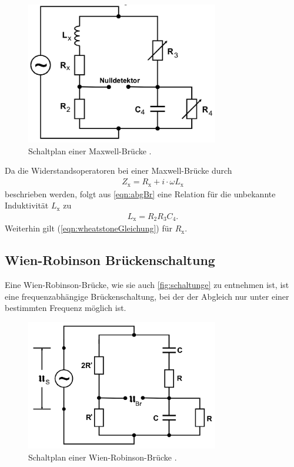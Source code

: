 \sloppy
\begin{figure}[H]
    \centering
    \includegraphics[width=0.75\textwidth]{dateien/aufgabed).png}
    \caption{Schaltplan einer Maxwell-Brücke \cite{anleitung}.}
    \label{fig:schaltungd}
\end{figure}
Da die Widerstandsoperatoren bei einer Maxwell-Brücke durch
\begin{align*}
    Z_{\text{x}} = R_{\text{x}} + i\cdot \omega L_{\text{x}}
\end{align*}
beschrieben werden, folgt aus \autoref{eqn:abgBr} eine Relation für die unbekannte Induktivität $L_{\text{x}}$ zu
\begin{align}
    L_{\text{x}} = R_2R_3C_4.
    \label{eqn:maxwellgl}
\end{align}
Weiterhin gilt (\ref{eqn:wheatstoneGleichung}) für $R_{\text{x}}$.

\subsection{Wien-Robinson Brückenschaltung}
Eine Wien-Robinson-Brücke, wie sie auch \autoref{fig:schaltunge} zu entnehmen ist, ist eine frequenzabhängige 
Brückenschaltung, bei der der Abgleich nur unter einer bestimmten Frequenz möglich ist.
\begin{figure}[H]
    \centering
    \includegraphics[width=0.75\textwidth]{dateien/aufgabee).png}
    \caption{Schaltplan einer Wien-Robinson-Brücke \cite{anleitung}.}
    \label{fig:schaltunge}
\end{figure}


